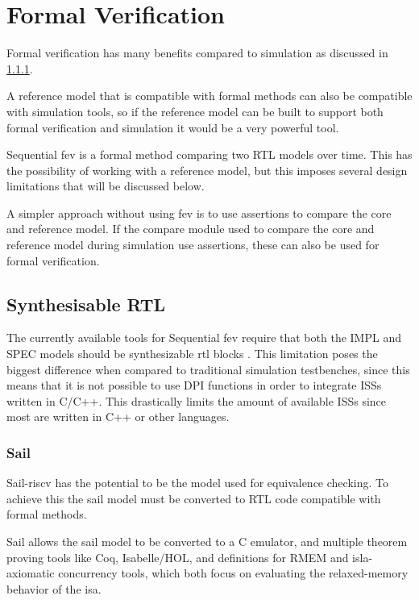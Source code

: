 \section{Formal Verification}

Formal verification has many benefits compared to simulation as discussed in \ref{}.

A reference model that is compatible with formal methods can also be compatible with simulation tools\cite{}, so if the reference model can be built to support both formal verification and simulation it would be a very powerful tool.

Sequential \acrfull{fev} is a formal method comparing two RTL models over time. This has the possibility of working with a reference model, but this imposes several design limitations that will be discussed below.

A simpler approach without using \acrfull{fev} is to use assertions to compare the core and reference model. If the compare module used to compare the core and reference model during simulation use assertions, these can also be used for formal verification.

\subsection{Synthesisable RTL}

The currently available tools for Sequential \acrshort{fev} require that both the IMPL and SPEC models should be synthesizable \acrshort{rtl} blocks \cite{seligmanFormalVerificationEssential2015}. This limitation poses the biggest difference when compared to traditional simulation testbenches, since this means that it is not possible to use DPI functions \cite{} in order to integrate ISSs written in C/C++. This drastically limits the amount of available ISSs since most are written in C++ or other languages. 

\subsubsection{Sail}

Sail-riscv has the potential to be the model used for equivalence checking.
To achieve this the sail model must be converted to RTL code compatible with formal methods.

Sail allows the sail model to be converted to a C emulator, and multiple theorem proving tools like Coq, Isabelle/HOL, and definitions for RMEM and isla-axiomatic concurrency tools, which both focus on evaluating the relaxed-memory behavior of the \acrshort{isa}. 


